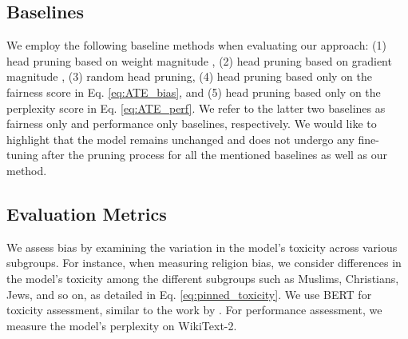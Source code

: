 \documentclass[letterpaper]{article} %
\newcommand{\goncalo}[1]
{\textcolor{orange}{{\bf}{\em #1}{\bf}}}
\begin{document}
\subsection{Baselines}\label{baselines}
We employ the following baseline methods when evaluating our approach: (1) head pruning based on weight magnitude \cite{han2015learning,han2015deep}, (2) head pruning based on gradient magnitude \cite{NEURIPS2019_2c601ad9}, (3) random head pruning, (4) head pruning based only on the fairness score in Eq. \eqref{eq:ATE_bias}, and (5) head pruning based only on the perplexity score in Eq. \eqref{eq:ATE_perf}. %
We refer to the latter two baselines as fairness only and performance only baselines, respectively.  
We would like to highlight that the model remains unchanged and does not undergo any fine-tuning after the pruning process for all the mentioned baselines as well as our method.
\subsection{Evaluation Metrics}\label{sec:metrics}
We assess bias by examining the variation in the model's toxicity across various subgroups. For instance, when measuring religion bias, we consider differences in the model's toxicity among the different subgroups such as Muslims, Christians, Jews, and so on, as detailed in Eq. \eqref{eq:pinned_toxicity}. We use BERT for toxicity assessment, similar to the work by \citet{dhamala2021bold}. For performance assessment, we measure the model's perplexity on WikiText-2.
\end{document}
